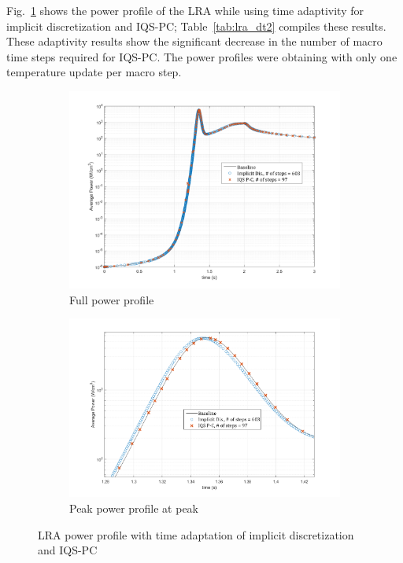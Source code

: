 \documentclass{elsarticle}
\newcommand{\fig}[1]{Fig.~\ref{#1}}                      %
\newcommand{\tbl}[1]{Table~\ref{#1}}                     %
\newcommand{\iqspc}{IQS-PC\xspace}
\begin{document}
\fig{fig:lra_dt2} shows the power profile of the LRA while using time adaptivity for implicit discretization and \iqspc; \tbl{tab:lra_dt2} compiles these results. These adaptivity results show the significant decrease in the number of macro time steps required for \iqspc. The power profiles were obtaining with only one temperature update per macro step.

\begin{figure}[!htbp]
\centering
\begin{subfigure}[!htbp]{0.49\textwidth}
\includegraphics[width=\textwidth]{figures/LRA_DT2.png}
\caption{Full power profile}
\end{subfigure}
\begin{subfigure}[!htbp]{0.49\textwidth}
\includegraphics[width=\textwidth]{figures/LRA_DT2_peak.png}
\caption{Peak power profile at peak}
\end{subfigure}
\caption{LRA power profile with time adaptation of implicit discretization and \iqspc}
\label{fig:lra_dt2}
\end{figure}
\end{document}

